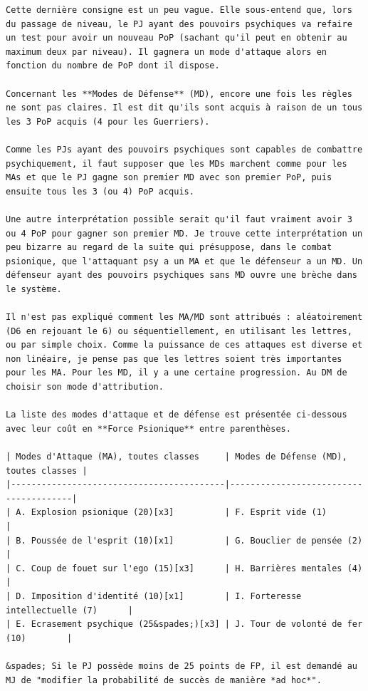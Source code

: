 \documentclass[11pt]{article}
\begin{document}
{\begin{verbatim}
Cette dernière consigne est un peu vague. Elle sous-entend que, lors du passage de niveau, le PJ ayant des pouvoirs psychiques va refaire un test pour avoir un nouveau PoP (sachant qu'il peut en obtenir au maximum deux par niveau). Il gagnera un mode d'attaque alors en fonction du nombre de PoP dont il dispose.

Concernant les **Modes de Défense** (MD), encore une fois les règles ne sont pas claires. Il est dit qu'ils sont acquis à raison de un tous les 3 PoP acquis (4 pour les Guerriers).

Comme les PJs ayant des pouvoirs psychiques sont capables de combattre psychiquement, il faut supposer que les MDs marchent comme pour les MAs et que le PJ gagne son premier MD avec son premier PoP, puis ensuite tous les 3 (ou 4) PoP acquis.

Une autre interprétation possible serait qu'il faut vraiment avoir 3 ou 4 PoP pour gagner son premier MD. Je trouve cette interprétation un peu bizarre au regard de la suite qui présuppose, dans le combat psionique, que l'attaquant psy a un MA et que le défenseur a un MD. Un défenseur ayant des pouvoirs psychiques sans MD ouvre une brèche dans le système.

Il n'est pas expliqué comment les MA/MD sont attribués : aléatoirement (D6 en rejouant le 6) ou séquentiellement, en utilisant les lettres, ou par simple choix. Comme la puissance de ces attaques est diverse et non linéaire, je pense pas que les lettres soient très importantes pour les MA. Pour les MD, il y a une certaine progression. Au DM de choisir son mode d'attribution.

La liste des modes d'attaque et de défense est présentée ci-dessous avec leur coût en **Force Psionique** entre parenthèses.

| Modes d'Attaque (MA), toutes classes     | Modes de Défense (MD), toutes classes |
|------------------------------------------|---------------------------------------|
| A. Explosion psionique (20)[x3]          | F. Esprit vide (1)                    |
| B. Poussée de l'esprit (10)[x1]          | G. Bouclier de pensée (2)             |
| C. Coup de fouet sur l'ego (15)[x3]      | H. Barrières mentales (4)             |
| D. Imposition d'identité (10)[x1]        | I. Forteresse intellectuelle (7)      |
| E. Ecrasement psychique (25&spades;)[x3] | J. Tour de volonté de fer (10)        |

&spades; Si le PJ possède moins de 25 points de FP, il est demandé au MJ de "modifier la probabilité de succès de manière *ad hoc*".


\end{verbatim}}
\end{document}
